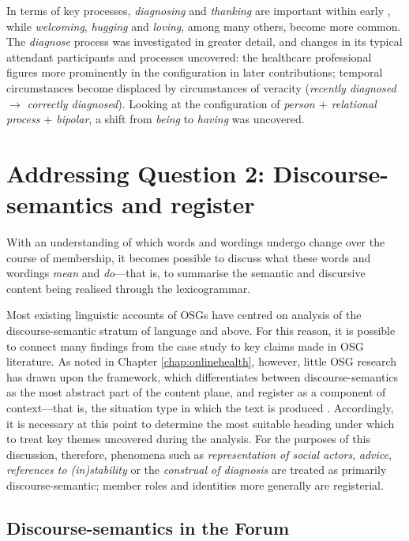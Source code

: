 In terms of key processes, \emph{diagnosing} and \emph{thanking} are important within early , while \emph{welcoming}, \emph{hugging} and \emph{loving}, among many others, become more common. The \emph{diagnose} process was investigated in greater detail, and changes in its typical attendant participants and processes uncovered: the healthcare professional figures more prominently in the configuration in later contributions; temporal circumstances become displaced by circumstances of veracity (\emph{recently diagnosed} $\rightarrow$ \emph{correctly diagnosed}). Looking at the configuration of \emph{person $+$ relational process $+$ bipolar}, a shift from \emph{being} to \emph{having} was uncovered. 

\section{Addressing Question 2: Discourse-semantics and register}

With an understanding of which words and wordings undergo change over the course of membership, it becomes possible to discuss what these words and wordings \emph{mean} and \emph{do}---that is, to summarise the semantic and discursive content being realised through the \gls{lexicogrammar}.

Most existing linguistic accounts of \glspl{OSG} have centred on analysis of the \gls{discourse-semantic} stratum of language and above. For this reason, it is possible to connect many findings from the case study to key claims made in \gls{OSG} literature. As noted in Chapter \ref{chap:onlinehealth}, however, little \gls{OSG} research has drawn upon the  framework, which differentiates between \glspl{discourse-semantic} as the most abstract part of the content plane, and register as a component of context---that is, the situation type in which the text is produced \cite{halliday_language_1989}. Accordingly, it is necessary at this point to determine the most suitable heading under which to treat key \glspl{theme} uncovered during the analysis. For the purposes of this discussion, therefore, phenomena such as \emph{representation of social actors}, \emph{advice}, \emph{references to (in)stability} or the \emph{construal of diagnosis} are treated as primarily \gls{discourse-semantic}; member roles and identities more generally are registerial.

\subsection{Discourse-semantics in the Forum}

